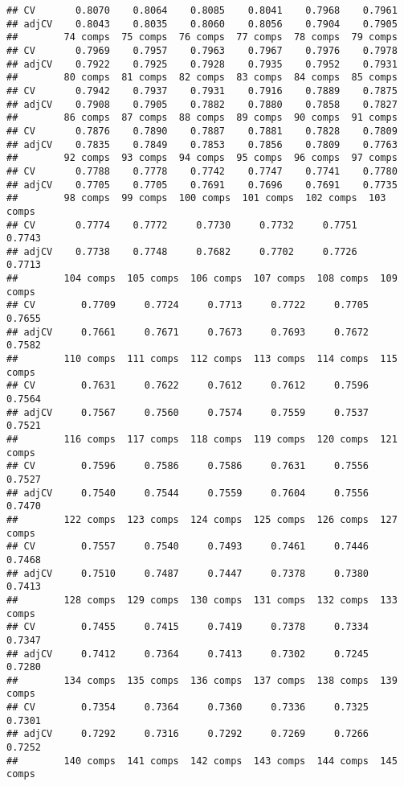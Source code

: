 \documentclass[]{article}
\begin{document}
\begin{verbatim}
## CV       0.8070    0.8064    0.8085    0.8041    0.7968    0.7961
## adjCV    0.8043    0.8035    0.8060    0.8056    0.7904    0.7905
##        74 comps  75 comps  76 comps  77 comps  78 comps  79 comps
## CV       0.7969    0.7957    0.7963    0.7967    0.7976    0.7978
## adjCV    0.7922    0.7925    0.7928    0.7935    0.7952    0.7931
##        80 comps  81 comps  82 comps  83 comps  84 comps  85 comps
## CV       0.7942    0.7937    0.7931    0.7916    0.7889    0.7875
## adjCV    0.7908    0.7905    0.7882    0.7880    0.7858    0.7827
##        86 comps  87 comps  88 comps  89 comps  90 comps  91 comps
## CV       0.7876    0.7890    0.7887    0.7881    0.7828    0.7809
## adjCV    0.7835    0.7849    0.7853    0.7856    0.7809    0.7763
##        92 comps  93 comps  94 comps  95 comps  96 comps  97 comps
## CV       0.7788    0.7778    0.7742    0.7747    0.7741    0.7780
## adjCV    0.7705    0.7705    0.7691    0.7696    0.7691    0.7735
##        98 comps  99 comps  100 comps  101 comps  102 comps  103 comps
## CV       0.7774    0.7772     0.7730     0.7732     0.7751     0.7743
## adjCV    0.7738    0.7748     0.7682     0.7702     0.7726     0.7713
##        104 comps  105 comps  106 comps  107 comps  108 comps  109 comps
## CV        0.7709     0.7724     0.7713     0.7722     0.7705     0.7655
## adjCV     0.7661     0.7671     0.7673     0.7693     0.7672     0.7582
##        110 comps  111 comps  112 comps  113 comps  114 comps  115 comps
## CV        0.7631     0.7622     0.7612     0.7612     0.7596     0.7564
## adjCV     0.7567     0.7560     0.7574     0.7559     0.7537     0.7521
##        116 comps  117 comps  118 comps  119 comps  120 comps  121 comps
## CV        0.7596     0.7586     0.7586     0.7631     0.7556     0.7527
## adjCV     0.7540     0.7544     0.7559     0.7604     0.7556     0.7470
##        122 comps  123 comps  124 comps  125 comps  126 comps  127 comps
## CV        0.7557     0.7540     0.7493     0.7461     0.7446     0.7468
## adjCV     0.7510     0.7487     0.7447     0.7378     0.7380     0.7413
##        128 comps  129 comps  130 comps  131 comps  132 comps  133 comps
## CV        0.7455     0.7415     0.7419     0.7378     0.7334     0.7347
## adjCV     0.7412     0.7364     0.7413     0.7302     0.7245     0.7280
##        134 comps  135 comps  136 comps  137 comps  138 comps  139 comps
## CV        0.7354     0.7364     0.7360     0.7336     0.7325     0.7301
## adjCV     0.7292     0.7316     0.7292     0.7269     0.7266     0.7252
##        140 comps  141 comps  142 comps  143 comps  144 comps  145 comps

\end{verbatim}
\end{document}
